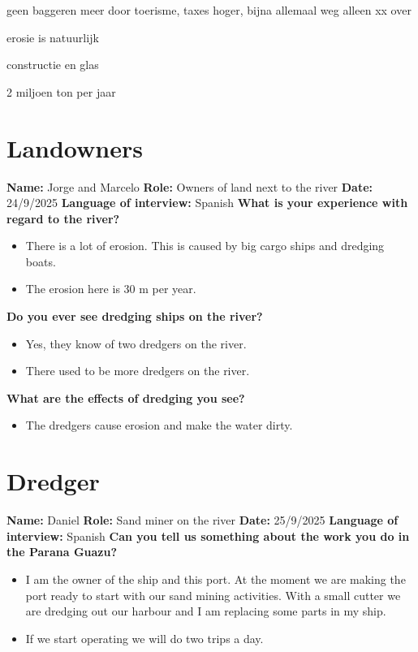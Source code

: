 geen baggeren meer door toerisme, taxes hoger, bijna allemaal weg
alleen xx over

erosie is natuurlijk

constructie en glas

2 miljoen ton per jaar



\section{Landowners}
\textbf{Name:} Jorge and Marcelo \newline
\textbf{Role:} Owners of land next to the river \newline
\textbf{Date:} 24/9/2025 \newline
\textbf{Language of interview:} Spanish \newline \newline
\textbf{What is your experience with regard to the river?}
\begin{itemize}
    \item There is a lot of erosion. This is caused by big cargo ships and dredging boats.
    \item The erosion here is 30 m per year.
\end{itemize}

\textbf{Do you ever see dredging ships on the river?}
\begin{itemize}
    \item Yes, they know of two dredgers on the river.
    \item There used to be more dredgers on the river.
\end{itemize}

\textbf{What are the effects of dredging you see?}
\begin{itemize}
    \item The dredgers cause erosion and make the water dirty.
\end{itemize}

\section{Dredger}
\textbf{Name:} Daniel \newline
\textbf{Role:} Sand miner on the river\newline
\textbf{Date:} 25/9/2025 \newline
\textbf{Language of interview:} Spanish \newline \newline
\textbf{Can you tell us something about the work you do in the Parana Guazu?}
\begin{itemize}
    \item I am the owner of the ship and this port. At the moment we are making the port ready to start with our sand mining activities. With a small cutter we are dredging out our harbour and I am replacing some parts in my ship. 
    \item If we start operating we will do two trips a day. 
\end{itemize}

